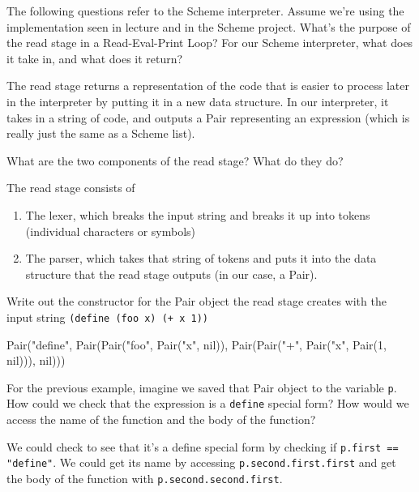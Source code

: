 \begin{blocksection}
The following questions refer to the Scheme interpreter. Assume we're using the implementation seen in lecture and 
in the Scheme project.
\question What's the purpose of the read stage in a Read-Eval-Print Loop? For our Scheme interpreter, what does it 
take in, and what does it return?
\begin{solution}[1in] 
The read stage returns a representation of the code that is easier to process later in the interpreter by putting it in a new data structure. In our interpreter,
it takes in a string of code, and outputs a Pair representing an expression (which is really just the same as a Scheme list).
\end{solution}

\question What are the two components of the read stage? What do they do?
\begin{solution}[1in]
The read stage consists of
\begin{enumerate}[1.]
\item The lexer, which breaks the input string and breaks it up into tokens (individual characters or symbols)
\item The parser, which takes that string of tokens and puts it into the data structure that the read stage outputs (in our case, a Pair).
\end{enumerate}
\end{solution}

\question Write out the constructor for the Pair object the read stage creates with the input string \texttt{(define (foo x) (+ x 1))}
\begin{solution}[1in]
Pair("define", Pair(Pair("foo", Pair("x", nil)), Pair(Pair("+", Pair("x", Pair(1, nil))), nil)))
\end{solution}

\question For the previous example, imagine we saved that Pair object to the variable \texttt{p}. How could we check that the expression 
is a \texttt{define} special form? How would we access the name of the function and the body of the function?
\begin{solution}[1in]
We could check to see that it's a define special form by checking if \lstinline$p.first == "define"$. 
\newline
We could get its name by accessing \lstinline$p.second.first.first$ and get the body of the function with \lstinline$p.second.second.first$.
\end{solution}
\end{blocksection}

